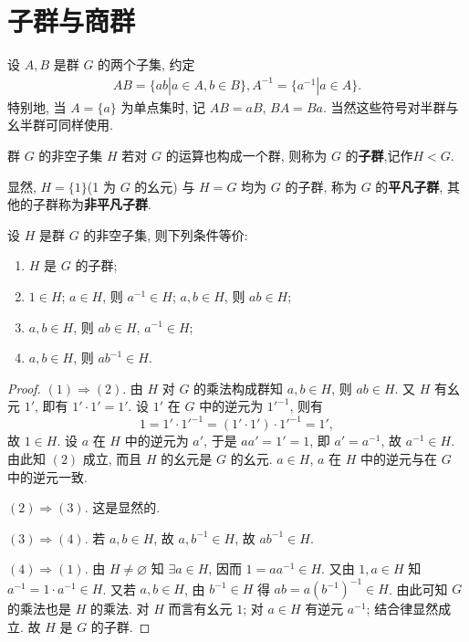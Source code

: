 \documentclass[../../main.tex]{subfiles}
\begin{document}
\section{子群与商群}

\begin{definition}
设 \( A, B \) 是群 \( G \) 的两个子集, 约定
\begin{align*}
AB = \{ab|a \in A, b \in B\} , A^{-1} = \{a^{-1}|a \in A\}.
\end{align*}
特别地, 当 \( A = \{a\} \) 为单点集时, 记 \( AB = aB \), \( BA = Ba \). 当然这些符号对半群与幺半群可同样使用.
\end{definition}

\begin{definition}
群 \( G \) 的非空子集 \( H \) 若对 \( G \) 的运算也构成一个群, 则称为 \( G \) 的\textbf{子群},记作$H<G$.
\end{definition}
\begin{remark}
显然, \( H = \{1\} \)(1 为 \( G \) 的幺元) 与 \( H = G \) 均为 \( G \) 的子群, 称为 \( G \) 的\textbf{平凡子群}, 其他的子群称为\textbf{非平凡子群}.
\end{remark}

\begin{theorem}
设 \( H \) 是群 \( G \) 的非空子集, 则下列条件等价:
\begin{enumerate}[(1)]
\item \( H \) 是 \( G \) 的子群;

\item \( 1 \in H \); \( a \in H \), 则 \( a^{-1} \in H \); \( a, b \in H \), 则 \( ab \in H \);

\item \( a, b \in H \), 则 \( ab \in H \), \( a^{-1} \in H \);

\item \( a, b \in H \), 则 \( ab^{-1} \in H \).
\end{enumerate}
\end{theorem}
\begin{proof}
\( (1) \Rightarrow (2) \). 由 \( H \) 对 \( G \) 的乘法构成群知 \( a, b \in H \), 则 \( ab \in H \). 又 \( H \) 有幺元 \( 1' \), 即有 \( 1' \cdot 1' = 1' \). 设 \( 1' \) 在 \( G \) 中的逆元为 \( 1'^{-1} \), 则有
\[
1 = 1' \cdot 1'^{-1} = (1' \cdot 1') \cdot 1'^{-1} = 1',
\]
故 \( 1 \in H \). 设 \( a \) 在 \( H \) 中的逆元为 \( a' \), 于是 \( aa' = 1' = 1 \), 即 \( a' = a^{-1} \), 故 \( a^{-1} \in H \). 由此知 \( (2) \) 成立, 而且 \( H \) 的幺元是 \( G \) 的幺元. \( a \in H \), \( a \) 在 \( H \) 中的逆元与在 \( G \) 中的逆元一致.

\( (2) \Rightarrow (3) \). 这是显然的.

\( (3) \Rightarrow (4) \). 若 \( a, b \in H \), 故 \( a, b^{-1} \in H \), 故 \( ab^{-1} \in H \).

\( (4) \Rightarrow (1) \). 由 \( H \neq \varnothing \) 知 \( \exists a \in H \), 因而 \( 1 = aa^{-1} \in H \). 又由 \( 1, a \in H \) 知 \( a^{-1} = 1 \cdot a^{-1} \in H \). 又若 \( a, b \in H \), 由 \( b^{-1} \in H \) 得 \( ab = a(b^{-1})^{-1} \in H \). 由此可知 \( G \) 的乘法也是 \( H \) 的乘法. 对 \( H \) 而言有幺元 \( 1 \); 对 \( a \in H \) 有逆元 \( a^{-1} \); 结合律显然成立. 故 \( H \) 是 \( G \) 的子群.
\end{proof}
\end{document}

